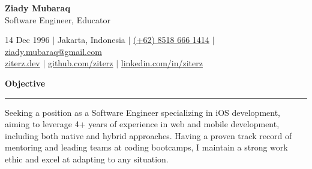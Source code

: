 \documentclass{article}
\newcommand{\header}[1]{
	\vspace{4mm}
	{\large \noindent \textbf{#1}}
	\vspace{1mm}
	\hrule
	\vspace{2mm}
}
\begin{document}
	\begin{flushleft}
		{\LARGE \textbf{Ziady Mubaraq}} \\
		{\large Software Engineer, Educator}

		\vspace{1mm}
		
		14 Dec 1996 $\mid$ Jakarta, Indonesia  $\mid$ \href{https://wa.me/6285186661414}{(+62) 8518 666 1414} $\mid$ \href{mailto:ziady.mubaraq@gmail.com}{ziady.mubaraq@gmail.com} \\
		\href{https://ziterz.dev}{ziterz.dev}  $\mid$ \href{https://github.com/ziterz}{github.com/ziterz} $\mid$ \href{https://linkedin.com/in/ziterz}{linkedin.com/in/ziterz}        
	\end{flushleft}

	\vspace{-3mm}

	\header{Objective}
		Seeking a position as a Software Engineer specializing in iOS development, aiming to leverage 4+ years of experience in web and mobile development, including both native and hybrid approaches. Having a proven track record of mentoring and leading teams at coding bootcamps, I maintain a strong work ethic and excel at adapting to any situation.
		\vspace{1mm}

	\setlength{\columnsep}{1.5em}
\end{document}

